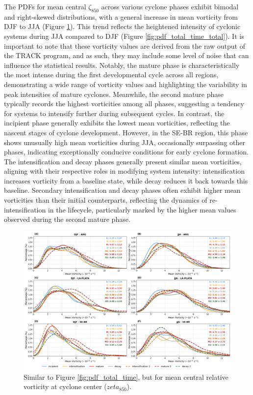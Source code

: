 The PDFs for mean central \(\zeta_{850}\) across various cyclone phases exhibit bimodal and right-skewed distributions, with a general increase in mean vorticity from DJF to JJA (Figure \ref{fig:pdf_mean_vorticity}). This trend reflects the heightened intensity of cyclonic systems during JJA compared to DJF (Figure \ref{fig:pdf_total_time_total}). It is important to note that these vorticity values are derived from the raw output of the TRACK program, and as such, they may include some level of noise that can influence the statistical results. Notably, the mature phase is characteristically the most intense during the first developmental cycle across all regions, demonstrating a wide range of vorticity values and highlighting the variability in peak intensities of mature cyclones. Meanwhile, the second mature phase typically records the highest vorticities among all phases, suggesting a tendency for systems to intensify further during subsequent cycles. In contrast, the incipient phase generally exhibits the lowest mean vorticities, reflecting the nascent stages of cyclone development. However, in the SE-BR region, this phase shows unusually high mean vorticities during JJA, occasionally surpassing other phases, indicating exceptionally conducive conditions for early cyclone formation. The intensification and decay phases generally present similar mean vorticities, aligning with their respective roles in modifying system intensity: intensification increases vorticity from a baseline state, while decay reduces it back towards this baseline. Secondary intensification and decay phases often exhibit higher mean vorticities than their initial counterparts, reflecting the dynamics of re-intensification in the lifecycle, particularly marked by the higher mean values observed during the second mature phase.


\begin{figure}[h!]
\centering
\includegraphics[width=\textwidth]{figs_4/pdf_mean_vorticity.png}
\caption[PDF - Mean Vorticity]{Similar to Figure \ref{fig:pdf_total_time}, but for mean central relative vorticity at cyclone center ($zeta_{850}$).}
\label{fig:pdf_mean_vorticity}
\end{figure}

